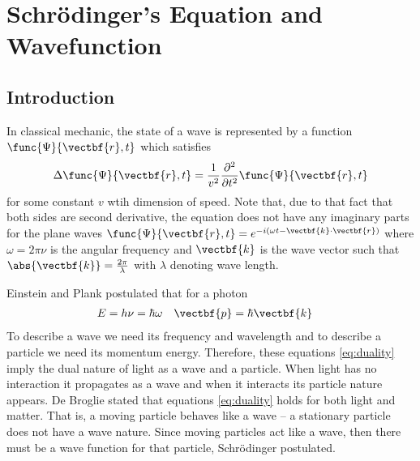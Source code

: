 \chapter{Schr\"{o}dinger's Equation and Wavefunction}
\section{Introduction}
In classical mechanic, the state of a wave is represented by a function \(\func{\Psi}{\vectbf{r},t}\) which satisfies
\begin{equation*}
    \Delta \func{\Psi}{\vectbf{r},t} = \frac{1}{v^2} \dfrac{\partial^2}{\partial t^2} \func{\Psi}{\vectbf{r},t}
\end{equation*}
for some constant \(v\) wtih dimension of speed. Note that, due to that fact that both sides are second derivative, the equation does not have any imaginary parts for the plane waves \(\func{\Psi}{\vectbf{r},t} = e^{- i(\omega t - \vectbf{k} \cdot \vectbf{r})}\) where \(\omega= 2\pi \nu\) is the angular frequency and \(\vectbf{k}\) is the wave vector such that \(\abs{\vectbf{k}} = \frac{2\pi}{\lambda}\) with \(\lambda\) denoting wave length.

Einstein and Plank postulated that for a photon
\begin{align}\label{eq:duality}
    E & = h \nu = \hbar \omega & \vectbf{p} & = \hbar \vectbf{k}
\end{align}
To describe a wave we need its frequency and wavelength and to describe a particle we need its momentum energy. Therefore, these equations \ref{eq:duality} imply the dual nature of light as a wave and a particle. When light has no interaction it propagates as a wave and when it interacts its particle nature appears. De Broglie stated that equations \ref{eq:duality} holds for both light and matter. That is, a moving particle behaves like a wave -- a stationary particle does not have a wave nature. Since moving particles act like a wave, then there must be a wave function for that particle, Schr\"{o}dinger postulated.

